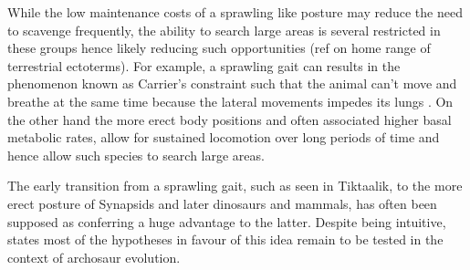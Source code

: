 \documentclass[a4paper,12pt]{article}
\begin{document}


%
%
While the low maintenance costs of a sprawling like posture may reduce the need to scavenge frequently, the ability to search large areas is several restricted in these groups hence likely reducing such opportunities (ref on home range of terrestrial ectoterms). For example, a sprawling gait can results in the phenomenon known as Carrier's constraint such that the animal can't move and breathe at the same time because the lateral movements impedes its lungs \citep{carrier1987evolution}. On the other hand the more erect body positions and often associated higher basal metabolic rates, allow for sustained locomotion over long periods of time and hence allow such species to search large areas.


The early transition from a sprawling gait, such as seen in Tiktaalik, to the more erect posture of Synapsids and later dinosaurs and mammals, has often been supposed as conferring a huge advantage to the latter.
Despite being intuitive, \cite{sullivan2015posture} states most of the hypotheses in favour of this idea remain to be tested in the context of archosaur evolution. 
\end{document}
